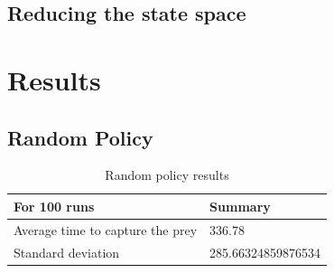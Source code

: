 \documentclass[paper=a4, fontsize=11pt]{scrartcl}
\numberwithin{equation}{section}		%
\numberwithin{figure}{section}			%
\numberwithin{table}{section}				%
\begin{document}
\subsection{Reducing the state space}
\label{reduce}

\section{Results}
\label{results}

\subsection{Random Policy}
\begin{table}[H]
\caption{Random policy results}
\centering
    \begin{tabular}{| l || l |}
    \hline
     For 100 runs & Summary \\ \hline
    Average time to capture the prey & 336.78\\ \hline
    Standard deviation & 285.66324859876534 \\
    \hline
    \end{tabular}
\end{table}
\end{document}
